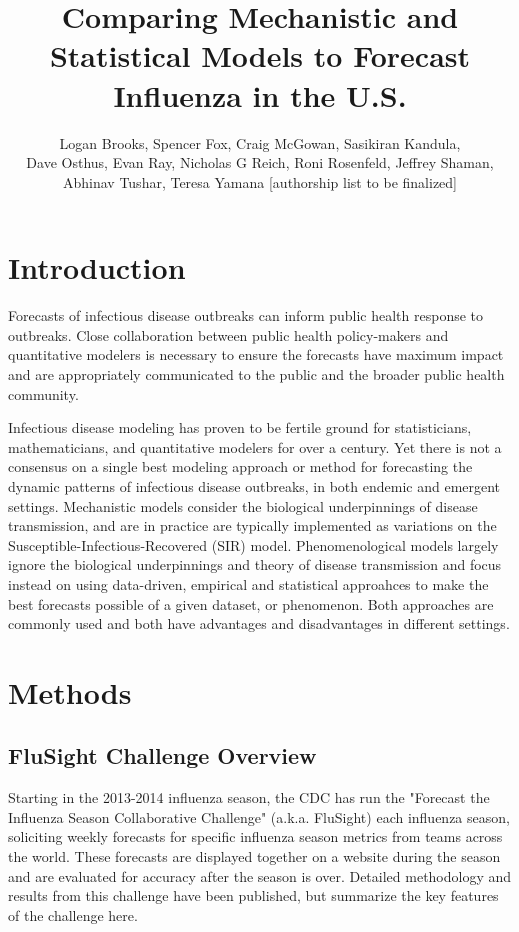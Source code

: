 \documentclass{article}
\title{Comparing Mechanistic and Statistical Models to Forecast Influenza in the U.S.}
\author{Logan Brooks, Spencer Fox, Craig McGowan, Sasikiran Kandula, \\ Dave Osthus, Evan Ray, Nicholas G Reich, Roni Rosenfeld, Jeffrey Shaman, \\Abhinav Tushar, Teresa Yamana [authorship list to be finalized]}
\begin{document}
\maketitle

\tableofcontents

\section{Introduction}
Forecasts of infectious disease outbreaks can inform public health response to outbreaks. Close collaboration between public health policy-makers and quantitative modelers is necessary to ensure the forecasts have maximum impact and are appropriately communicated to the public and the broader public health community. 

Infectious disease modeling has proven to be fertile ground for statisticians, mathematicians, and quantitative modelers for over a century. Yet there is not a consensus on a single best modeling approach or method for forecasting the dynamic patterns of infectious disease outbreaks, in both endemic and emergent settings. Mechanistic models consider the biological underpinnings of disease transmission, and are in practice are typically implemented as variations on the Susceptible-Infectious-Recovered (SIR) model. Phenomenological models largely ignore the biological underpinnings and theory of disease transmission and focus instead on using data-driven, empirical and statistical approahces to make the best forecasts possible of a given dataset, or phenomenon. Both approaches are commonly used and both have advantages and disadvantages in different settings.   


\section{Methods}

\subsection{FluSight Challenge Overview}

Starting in the 2013-2014 influenza season, the CDC has run the "Forecast the Influenza Season Collaborative Challenge" (a.k.a. FluSight) each influenza season, soliciting weekly forecasts for specific influenza season metrics from teams across the world. These forecasts are displayed together on a website during the season and are evaluated for accuracy after the season is over.\cite{PhiResearchLab} 
Detailed methodology and results from this challenge have been published\cite{Biggerstaff2016}, but summarize the key features of the challenge here.
\end{document}
